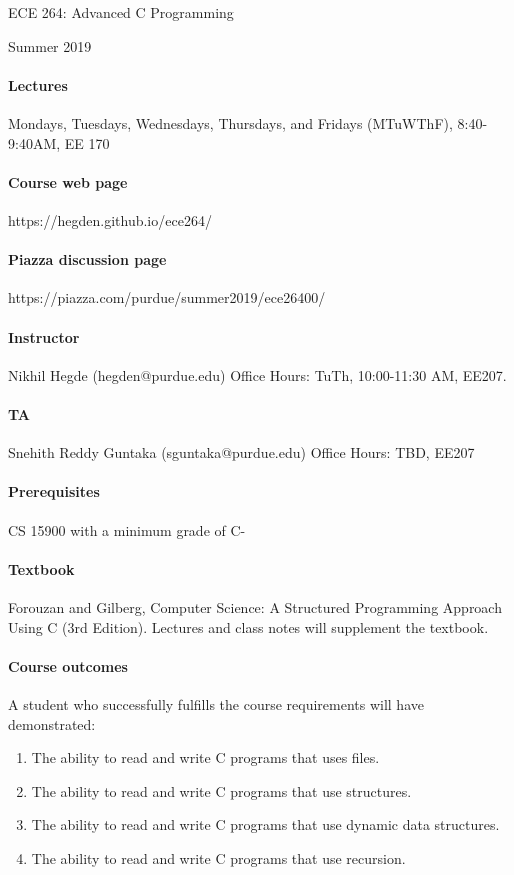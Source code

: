 \documentclass{article}
\begin{document}
\begin{center}{\LARGE ECE 264: Advanced C Programming} \end{center}
\begin{center}{\large Summer 2019} \end{center}

\bigskip

\paragraph{Lectures}
Mondays, Tuesdays, Wednesdays, Thursdays, and Fridays (MTuWThF), 8:40-9:40AM, EE 170
\paragraph{Course web page} https://hegden.github.io/ece264/
\paragraph{Piazza discussion page} https://piazza.com/purdue/summer2019/ece26400/

\paragraph{Instructor}
Nikhil Hegde (hegden@purdue.edu)
Office Hours: TuTh, 10:00-11:30 AM, EE207.

\paragraph{TA}
Snehith Reddy Guntaka (sguntaka@purdue.edu)
Office Hours: TBD, EE207

\paragraph{Prerequisites} CS 15900 with a minimum grade of C-
\paragraph{Textbook} Forouzan and Gilberg, Computer Science: A Structured Programming Approach Using C (3rd Edition). Lectures and class notes will supplement the textbook.
\paragraph{Course outcomes} A student who successfully fulfills the course requirements will have demonstrated:
\begin{enumerate}
\item The ability to read and write C programs that uses files. 
\item The ability to read and write C programs that use structures. 
\item The ability to read and write C programs that use dynamic data structures.
\item The ability to read and write C programs that use recursion. 
\end{enumerate}
\end{document}
